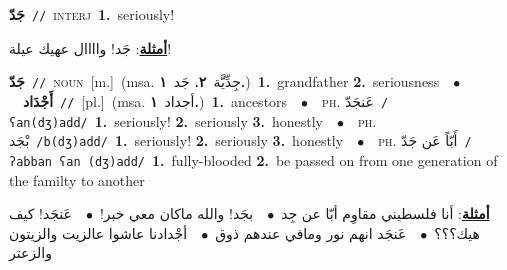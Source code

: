 \documentclass[10pt,a4paper,twoside]{article} %
\begin{document}
\begin{multicols}{2}
{{{{{{{{{{{\setlength\topsep{0pt}\textbf{\foreignlanguage{arabic}{جَدّ}}\ {\color{gray}\texttt{//}\color{black}}\ \textsc{interj}\ \textbf{1.}~seriously!\  \begin{flushright}\color{gray}\foreignlanguage{arabic}{\textbf{\underline{\foreignlanguage{arabic}{أمثلة}}}: جَد! واااال عهيك عيلة!}\end{flushright}\color{black}} \vspace{2mm}

{\setlength\topsep{0pt}\textbf{\foreignlanguage{arabic}{جَدّ}}\ {\color{gray}\texttt{//}\color{black}}\ \textsc{noun}\ [m.]\ \color{gray}(msa. \foreignlanguage{arabic}{جِدِّيَّة}~\foreignlanguage{arabic}{\textbf{٢.}}  \foreignlanguage{arabic}{جَد}~\foreignlanguage{arabic}{\textbf{١.}})\color{black}\ \textbf{1.}~grandfather  \textbf{2.}~seriousness\ \ $\bullet$\ \ \setlength\topsep{0pt}\textbf{\foreignlanguage{arabic}{أَجْدَاد}}\ {\color{gray}\texttt{//}\color{black}}\ [pl.]\ \color{gray}(msa. \foreignlanguage{arabic}{أجداد}~\foreignlanguage{arabic}{\textbf{١.}})\color{black}\ \textbf{1.}~ancestors\ \ $\bullet$\ \ \textsc{ph.} \color{gray} \foreignlanguage{arabic}{عَنجَدّ}\color{black}\ {\color{gray}\texttt{/{\sffamily ʕan(dʒ)add}/}\color{black}}\ \textbf{1.}~seriously!  \textbf{2.}~seriously  \textbf{3.}~honestly\ \ $\bullet$\ \ \textsc{ph.} \color{gray} \foreignlanguage{arabic}{بْجَد}\color{black}\ {\color{gray}\texttt{/{\sffamily b(dʒ)add}/}\color{black}}\ \textbf{1.}~seriously!  \textbf{2.}~seriously  \textbf{3.}~honestly\ \ $\bullet$\ \ \textsc{ph.} \color{gray} \foreignlanguage{arabic}{أَبّاً عَن جَدّ}\color{black}\ {\color{gray}\texttt{/{\sffamily ʔabban ʕan (dʒ)add}/}\color{black}}\ \textbf{1.}~fully-blooded  \textbf{2.}~be passed on from one generation of the familty to another\  \begin{flushright}\color{gray}\foreignlanguage{arabic}{\textbf{\underline{\foreignlanguage{arabic}{أمثلة}}}: أنا فلسطيني مقاوِم أبّا عن جِد\ $\bullet$\ \  بجَد! والله ماكان معي خبر!\ $\bullet$\ \  عَنجَد! كيف هيك؟؟؟\ $\bullet$\ \  عَنجَد انهم نور ومافي عندهم ذوق\ $\bullet$\ \  أجْدادنا عاشوا عالزيت والزيتون والزعتر}\end{flushright}\color{black}} \vspace{2mm}

}}}}}}}}}}
\end{multicols}
\end{document}
